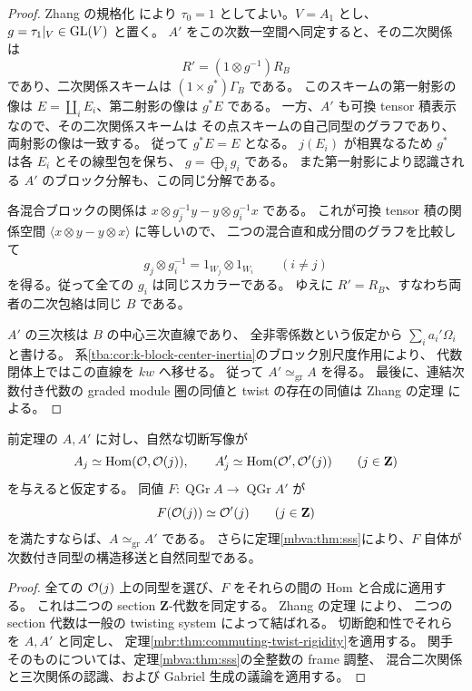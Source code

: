 \begin{proof}
Zhang の規格化 \cite[Proposition~2.4]{TBPZhangTwist}により
$\tau_0=1$ としてよい。$V=A_1$ とし、
$g=\tau_1|_V\in\operatorname{GL}(V)$ と置く。
$A'$ をこの次数一空間へ同定すると、その二次関係は
\[
 R'=(1\otimes g^{-1})R_B
\]
であり、二次関係スキームは
$(1\times g^*)\Gamma_B$ である。
このスキームの第一射影の像は $E=\coprod_iE_i$、第二射影の像は $g^*E$ である。
一方、$A'$ も可換 tensor 積表示なので、その二次関係スキームは
その点スキームの自己同型のグラフであり、両射影の像は一致する。
従って $g^*E=E$ となる。
$j(E_i)$ が相異なるため $g^*$ は各 $E_i$ とその線型包を保ち、
$g=\bigoplus_i g_i$ である。
また第一射影により認識される $A'$ のブロック分解も、この同じ分解である。

各混合ブロックの関係は
$x\otimes g_j^{-1}y-y\otimes g_i^{-1}x$ である。
これが可換 tensor 積の関係空間
$\langle x\otimes y-y\otimes x\rangle$ に等しいので、
二つの混合直和成分間のグラフを比較して
\[
 g_j\otimes g_i^{-1}=1_{W_j}\otimes1_{W_i}
 \qquad(i\ne j)
\]
を得る。従って全ての $g_i$ は同じスカラーである。
ゆえに $R'=R_B$、すなわち両者の二次包絡は同じ $B$ である。

$A'$ の三次核は $B$ の中心三次直線であり、
全非零係数という仮定から $\sum_i a_i'\Omega_i$ と書ける。
系\ref{tba:cor:k-block-center-inertia}のブロック別尺度作用により、
代数閉体上ではこの直線を $kw$ へ移せる。
従って $A'\simeq_{\mathrm{gr}}A$ を得る。
最後に、連結次数付き代数の graded module 圏の同値と twist の存在の同値は
Zhang の定理 \cite[Theorem~3.5]{TBPZhangTwist}による。
\end{proof}

\begin{corollary}
\label{mbr:cor:sss-recognition}
前定理の $A,A'$ に対し、自然な切断写像が
\[
 A_j\simeq\operatorname{Hom}(\mathcal O,\mathcal O(j)),\qquad
 A'_j\simeq\operatorname{Hom}(\mathcal O',\mathcal O'(j))\qquad(j\in\mathbf Z)
\]
を与えると仮定する。
同値 $F:\operatorname{QGr}A\to\operatorname{QGr}A'$ が
\begin{equation}\label{mbr:eq:sss}
 F(\mathcal O(j))\simeq\mathcal O'(j)\qquad(j\in\mathbf Z)
\end{equation}
を満たすならば、$A\simeq_{\mathrm{gr}}A'$ である。
さらに定理\ref{mbva:thm:sss}により、$F$ 自体が次数付き同型の構造移送と自然同型である。
\end{corollary}
\begin{proof}
全ての $\mathcal O(j)$ 上の同型を選び、$F$ をそれらの間の Hom と合成に適用する。
これは二つの section $\mathbf Z$-代数を同定する。
Zhang の定理 \cite[Theorems~3.3 and~3.7(2)]{TBPZhangTwist}により、
二つの section 代数は一般の twisting system によって結ばれる。
切断飽和性でそれらを $A,A'$ と同定し、
定理\ref{mbr:thm:commuting-twist-rigidity}を適用する。
関手そのものについては、定理\ref{mbva:thm:sss}の全整数の frame 調整、
混合二次関係と三次関係の認識、および Gabriel 生成の議論を適用する。
\end{proof}

